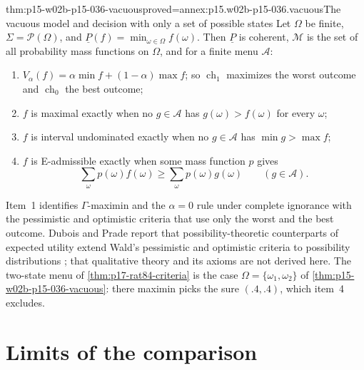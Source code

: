 \begin{hbtheorem}{thm:p15-w02b-p15-036-vacuous}{proved=annex:p15.w02b-p15-036.vacuous}{The vacuous model and decision with only a set of possible states}
Let \(\Omega\) be finite, \(\Sigma=\mathcal P(\Omega)\), and
\(\underline P(f)=\min_{\omega\in\Omega}f(\omega)\). Then \(\underline P\)
is coherent, \(\mathcal M\) is the set of all probability mass functions on
\(\Omega\), and for a finite menu \(\mathcal A\):
\begin{enumerate}
\item \(V_\alpha(f)=\alpha\min f+(1-\alpha)\max f\); so
 \(\operatorname{ch}_1\) maximizes the worst outcome and
 \(\operatorname{ch}_0\) the best outcome;
\item \(f\) is maximal exactly when no \(g\in\mathcal A\) has
 \(g(\omega)>f(\omega)\) for every \(\omega\);
\item \(f\) is interval undominated exactly when no \(g\in\mathcal A\) has
 \(\min g>\max f\);
\item \(f\) is E-admissible exactly when some mass function \(p\) gives
 \[
  \textstyle\sum_\omega p(\omega)f(\omega)\geq\sum_\omega p(\omega)g(\omega)
  \qquad(g\in\mathcal A).
 \]
\end{enumerate}
\end{hbtheorem}

Item~1 identifies \(\Gamma\)-maximin and the \(\alpha=0\) rule under
complete ignorance with the pessimistic and optimistic criteria that use
only the worst and the best outcome. Dubois and Prade report that
possibility-theoretic counterparts of expected utility extend Wald's
pessimistic and optimistic criteria to possibility distributions
\cite[p.~308]{DuboisPrade2021RepresentingBelief}; that qualitative theory
and its axioms are not derived here. The two-state menu of
\cref{thm:p17-rat84-criteria} is the case \(\Omega=\{\omega_1,\omega_2\}\)
of \cref{thm:p15-w02b-p15-036-vacuous}: there maximin picks the sure
\((.4,.4)\), which item~4 excludes.

\section{Limits of the comparison}
\label{sec:p15-w02b-p15-036-limits}


